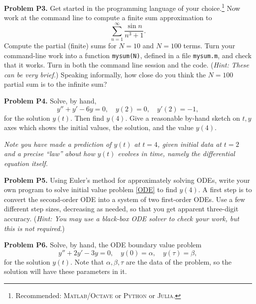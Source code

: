 \documentclass[12pt]{amsart}
\newcommand{\Julia}{\textsc{Julia}\xspace}
\newcommand{\Matlab}{\textsc{Matlab}\xspace}
\newcommand{\Octave}{\textsc{Octave}\xspace}
\newcommand{\Python}{\textsc{Python}\xspace}
\newcommand{\prob}[1]{\bigskip\noindent\textbf{#1}\quad }
\begin{document}
\prob{Problem P3.}  Get started in the programming language of your choice.\footnote{Recommended: \Matlab/\Octave or \Python or \Julia.}  Now work at the command line to compute a finite sum approximation to
	$$\sum_{n=1}^\infty \frac{\sin n}{n^3+1}.$$
Compute the partial (finite) sums for $N=10$ and $N=100$ terms.  Turn your command-line work into a function \texttt{mysum(N)}, defined in a file  \texttt{mysum.m}, and check that it works.  Turn in both the command line session and the code.  (\emph{Hint:  These can be very brief.})  Speaking informally, how close do you think the $N=100$ partial sum is to the infinite sum?

\prob{Problem P4.}  Solve, by hand,
\begin{equation}\label{ODE}
y'' + y' - 6 y = 0, \quad y(2)=0, \quad y'(2)=-1,
\end{equation}
for the solution $y(t)$.  Then find $y(4)$.  Give a reasonable by-hand sketch on $t,y$ axes which shows the initial values, the solution, and the value $y(4)$.

\emph{Note you have made a \emph{prediction} of $y(t)$ at $t=4$, given initial data at $t=2$ and a precise ``law'' about how $y(t)$ evolves in time, namely the differential equation itself.}

\prob{Problem P5.}  Using Euler's method for approximately solving ODEs, write your own program to solve initial value problem \eqref{ODE} to find $y(4)$.  A first step is to convert the second-order ODE into a system of two first-order ODEs.  Use a few different step sizes, decreasing as needed, so that you get apparent three-digit accuracy.  (\emph{Hint:  You may use a black-box ODE solver to \emph{check} your work, but this is not required.})

\prob{Problem P6.}  Solve, by hand, the ODE boundary value problem
\begin{equation}\label{ODEBVP}
y'' + 2 y' - 3 y = 0, \quad y(0)=\alpha, \quad y(\tau)=\beta,
\end{equation}
for the solution $y(t)$.  Note that $\alpha,\beta,\tau$ are the data of the problem, so the solution will have these parameters in it.
\end{document}
